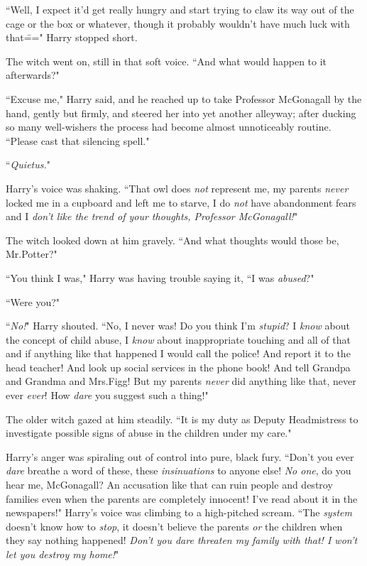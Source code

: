 ``Well, I expect it'd get really hungry and start trying to claw its way out of the cage or the box or whatever, though it probably wouldn't have much luck with that\===" Harry stopped short.

The witch went on, still in that soft voice. ``And what would happen to it afterwards?"

``Excuse me," Harry said, and he reached up to take Professor McGonagall by the hand, gently but firmly, and steered her into yet another alleyway; after ducking so many well-wishers the process had become almost unnoticeably routine. ``Please cast that silencing spell."

``\emph{Quietus.}"

Harry's voice was shaking. ``That owl does \emph{not} represent me, my parents \emph{never} locked me in a cupboard and left me to starve, I do \emph{not} have abandonment fears and I \emph{don't like the trend of your thoughts, Professor McGonagall!}"

The witch looked down at him gravely. ``And what thoughts would those be, Mr.\?Potter?"

``You think I was," Harry was having trouble saying it, ``I was \emph{abused}?"

``Were you?"

``\emph{No!}" Harry shouted. ``No, I never was! Do you think I'm \emph{stupid}? I \emph{know} about the concept of child abuse, I \emph{know} about inappropriate touching and all of that and if anything like that happened I would call the police! And report it to the head teacher! And look up social services in the phone book! And tell Grandpa and Grandma and Mrs.\?Figg! But my parents \emph{never} did anything like that, never ever \emph{ever}! How \emph{dare} you suggest such a thing!"

The older witch gazed at him steadily. ``It is my duty as Deputy Headmistress to investigate possible signs of abuse in the children under my care."

Harry's anger was spiraling out of control into pure, black fury. ``Don't you ever \emph{dare} breathe a word of these, these \emph{insinuations} to anyone else! \emph{No one}, do you hear me, McGonagall? An accusation like that can ruin people and destroy families even when the parents are completely innocent! I've read about it in the newspapers!" Harry's voice was climbing to a high-pitched scream. ``The \emph{system} doesn't know how to \emph{stop}, it doesn't believe the parents \emph{or} the children when they say nothing happened! \emph{Don't you dare threaten my family with that! I won't let you destroy my home!}"

